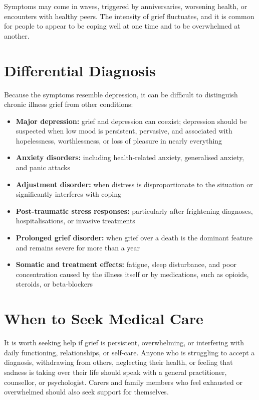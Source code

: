Symptoms may come in waves, triggered by anniversaries, worsening health, or encounters with healthy peers. The intensity of grief fluctuates, and it is common for people to appear to be coping well at one time and to be overwhelmed at another.

\section*{Differential Diagnosis}
Because the symptoms resemble depression, it can be difficult to distinguish chronic illness grief from other conditions:

\begin{itemize}
    \item \textbf{Major depression:} grief and depression can coexist; depression should be suspected when low mood is persistent, pervasive, and associated with hopelessness, worthlessness, or loss of pleasure in nearly everything
    \item \textbf{Anxiety disorders:} including health-related anxiety, generalised anxiety, and panic attacks
    \item \textbf{Adjustment disorder:} when distress is disproportionate to the situation or significantly interferes with coping
    \item \textbf{Post-traumatic stress responses:} particularly after frightening diagnoses, hospitalisations, or invasive treatments
    \item \textbf{Prolonged grief disorder:} when grief over a death is the dominant feature and remains severe for more than a year
    \item \textbf{Somatic and treatment effects:} fatigue, sleep disturbance, and poor concentration caused by the illness itself or by medications, such as opioids, steroids, or beta-blockers
\end{itemize}

\section*{When to Seek Medical Care}
It is worth seeking help if grief is persistent, overwhelming, or interfering with daily functioning, relationships, or self-care. Anyone who is struggling to accept a diagnosis, withdrawing from others, neglecting their health, or feeling that sadness is taking over their life should speak with a general practitioner, counsellor, or psychologist. Carers and family members who feel exhausted or overwhelmed should also seek support for themselves.

